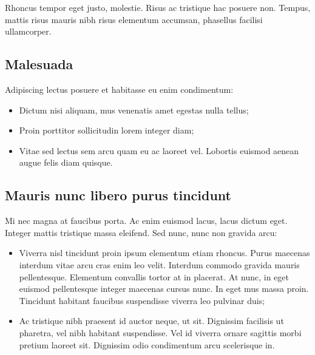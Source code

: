 \documentclass[
]{HyperedReport}
\begin{document}
Rhoncus tempor eget justo, molestie. Risus ac tristique hac posuere non. Tempus, mattis risus mauris nibh risus elementum accumsan, phasellus facilisi ullamcorper.

\subsection{Malesuada}

Adipiscing lectus posuere et habitasse eu enim condimentum:

\begin{itemize}
	\item Dictum nisi aliquam, mus venenatis amet egestas nulla tellus;
	\item Proin porttitor sollicitudin lorem integer diam;
	\item Vitae sed lectus sem arcu quam eu ac laoreet vel. Lobortis euismod aenean augue felis diam quisque.
\end{itemize}

\subsection{Mauris nunc libero purus tincidunt}

Mi nec magna at faucibus porta. Ac enim euismod lacus, lacus dictum eget. Integer mattis tristique massa eleifend. Sed nunc, nunc non gravida arcu:

\begin{itemize}
	\item Viverra nisl tincidunt proin ipsum elementum etiam rhoncus. Purus maecenas interdum vitae arcu cras enim leo velit. Interdum commodo gravida mauris pellentesque. Elementum convallis tortor at in placerat. At nunc, in eget euismod pellentesque integer maecenas cursus nunc. In eget mus massa proin. Tincidunt habitant faucibus suspendisse viverra leo pulvinar duis;
	\item Ac tristique nibh praesent id auctor neque, ut sit. Dignissim facilisis ut pharetra, vel nibh habitant suspendisse. Vel id viverra ornare sagittis morbi pretium laoreet sit. Dignissim odio condimentum arcu scelerisque in.
\end{itemize}
\end{document}

